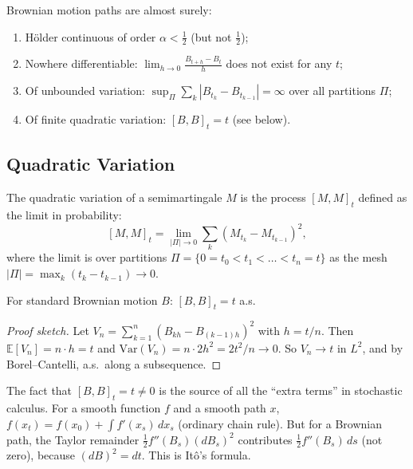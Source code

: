 \begin{proposition}
Brownian motion paths are almost surely:
\begin{enumerate}[label=(\roman*)]
    \item H\"older continuous of order $\alpha < \tfrac{1}{2}$ (but not $\tfrac{1}{2}$);
    \item Nowhere differentiable: $\lim_{h \to 0} \frac{B_{t+h} - B_t}{h}$ does not
    exist for any $t$;
    \item Of unbounded variation: $\sup_\Pi \sum_k |B_{t_k} - B_{t_{k-1}}| = \infty$
    over all partitions $\Pi$;
    \item Of finite quadratic variation: $[B,B]_t = t$ (see below).
\end{enumerate}
\end{proposition}

\subsection{Quadratic Variation}

\begin{definition}
The quadratic variation of a semimartingale $M$ is the process $[M,M]_t$ defined as
the limit in probability:
\[
    [M,M]_t = \lim_{|\Pi| \to 0} \sum_k (M_{t_k} - M_{t_{k-1}})^2,
\]
where the limit is over partitions $\Pi = \{0 = t_0 < t_1 < \dots < t_n = t\}$ as the
mesh $|\Pi| = \max_k (t_k - t_{k-1}) \to 0$.
\end{definition}

\begin{proposition}
For standard Brownian motion $B$: $[B,B]_t = t$ a.s.
\end{proposition}

\begin{proof}[Proof sketch]
Let $V_n = \sum_{k=1}^n (B_{kh} - B_{(k-1)h})^2$ with $h = t/n$. Then
$\mathbb{E}[V_n] = n \cdot h = t$ and $\mathrm{Var}(V_n) = n \cdot 2h^2 = 2t^2/n \to 0$.
So $V_n \to t$ in $L^2$, and by Borel--Cantelli, a.s.\ along a subsequence.
\end{proof}

\begin{remark}
The fact that $[B,B]_t = t \neq 0$ is the source of all the ``extra terms'' in
stochastic calculus. For a smooth function $f$ and a smooth path $x$,
$f(x_t) = f(x_0) + \int f'(x_s)\, dx_s$ (ordinary chain rule). But for a Brownian path,
the Taylor remainder $\frac{1}{2}f''(B_s)(dB_s)^2$ contributes $\frac{1}{2}f''(B_s)\, ds$
(not zero), because $(dB)^2 = dt$. This is It\^o's formula.
\end{remark}

